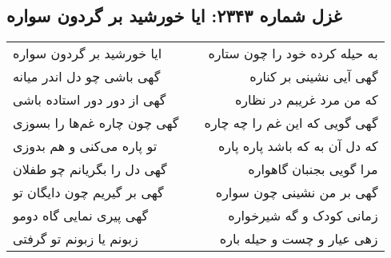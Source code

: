 \begin{center}
\section*{غزل شماره ۲۳۴۳: ایا خورشید بر گردون سواره}
\label{sec:2343}
\begin{longtable}{l p{0.5cm} r}
ایا خورشید بر گردون سواره
&&
به حیله کرده خود را چون ستاره
\\
گهی باشی چو دل اندر میانه
&&
گهی آیی نشینی بر کناره
\\
گهی از دور دور استاده باشی
&&
که من مرد غریبم در نظاره
\\
گهی چون چاره غم‌ها را بسوزی
&&
گهی گویی که این غم را چه چاره
\\
تو پاره می‌کنی و هم بدوزی
&&
که دل آن به که باشد پاره پاره
\\
گهی دل را بگریانم چو طفلان
&&
مرا گویی بجنبان گاهواره
\\
گهی بر گیریم چون دایگان تو
&&
گهی بر من نشینی چون سواره
\\
گهی پیری نمایی گاه دومو
&&
زمانی کودک و گه شیرخواره
\\
زبونم یا زبونم تو گرفتی
&&
زهی عیار و چست و حیله باره
\\
\end{longtable}
\end{center}
